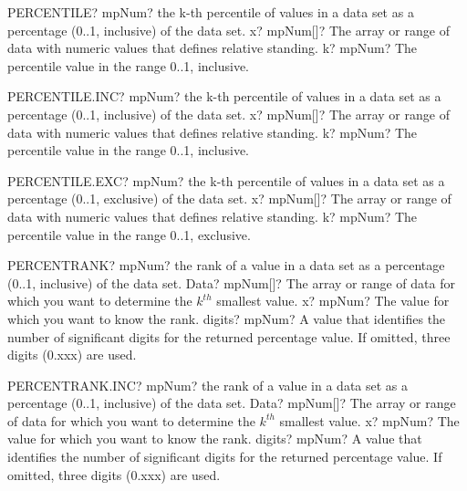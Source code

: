 \documentclass[12pt,a4paper,openany]{book}
\begin{document}
\begin{mpFunctionsExtract}
\mpWorksheetFunctionTwoNotImplemented
{PERCENTILE? mpNum? the k-th percentile of values  in a data set as a percentage (0..1, inclusive) of the data set.}
{x? mpNum[]?  The array or range of data with numeric values that defines relative standing.}
{k? mpNum? The percentile value in the range 0..1, inclusive.}
\end{mpFunctionsExtract}

\begin{mpFunctionsExtract}
\mpWorksheetFunctionTwoNotImplemented
{PERCENTILE.INC? mpNum? the k-th percentile of values  in a data set as a percentage (0..1, inclusive) of the data set.}
{x? mpNum[]?  The array or range of data with numeric values that defines relative standing.}
{k? mpNum? The percentile value in the range 0..1, inclusive.}
\end{mpFunctionsExtract}

\begin{mpFunctionsExtract}
\mpWorksheetFunctionTwoNotImplemented
{PERCENTILE.EXC? mpNum? the k-th percentile of values  in a data set as a percentage (0..1, exclusive) of the data set.}
{x? mpNum[]?  The array or range of data with numeric values that defines relative standing.}
{k? mpNum? The percentile value in the range 0..1, exclusive.}
\end{mpFunctionsExtract}

\begin{mpFunctionsExtract}
\mpWorksheetFunctionThreeNotImplemented
{PERCENTRANK? mpNum? the rank of a value in a data set as a percentage (0..1, inclusive) of the data set.}
{Data? mpNum[]?  The array or range of data for which you want to determine the $k^{th}$ smallest  value.}
{x? mpNum? The value for which you want to know the rank.}
{digits? mpNum? A value that identifies the number of significant digits for the returned percentage value. If omitted, three digits (0.xxx) are used.}
\end{mpFunctionsExtract}

\begin{mpFunctionsExtract}
\mpWorksheetFunctionThreeNotImplemented
{PERCENTRANK.INC? mpNum? the rank of a value in a data set as a percentage (0..1, inclusive) of the data set.}
{Data? mpNum[]?  The array or range of data for which you want to determine the $k^{th}$ smallest  value.}
{x? mpNum? The value for which you want to know the rank.}
{digits? mpNum? A value that identifies the number of significant digits for the returned percentage value. If omitted, three digits (0.xxx) are used.}
\end{mpFunctionsExtract}
\end{document}
